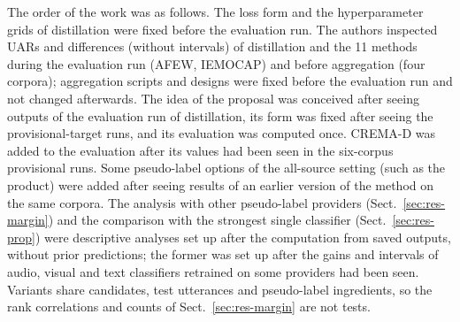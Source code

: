 The order of the work was as follows. The loss form and the hyperparameter grids of distillation were fixed before the evaluation run. The authors inspected UARs and differences (without intervals) of distillation and the 11 methods during the evaluation run (AFEW, IEMOCAP) and before aggregation (four corpora); aggregation scripts and designs were fixed before the evaluation run and not changed afterwards. The idea of the proposal was conceived after seeing outputs of the evaluation run of distillation, its form was fixed after seeing the provisional-target runs, and its evaluation was computed once. CREMA-D was added to the evaluation after its values had been seen in the six-corpus provisional runs. Some pseudo-label options of the all-source setting (such as the product) were added after seeing results of an earlier version of the method on the same corpora. The analysis with other pseudo-label providers (Sect.~\ref{sec:res-margin}) and the comparison with the strongest single classifier (Sect.~\ref{sec:res-prop}) were descriptive analyses set up after the computation from saved outputs, without prior predictions; the former was set up after the gains and intervals of audio, visual and text classifiers retrained on some providers had been seen. Variants share candidates, test utterances and pseudo-label ingredients, so the rank correlations and counts of Sect.~\ref{sec:res-margin} are not tests.
